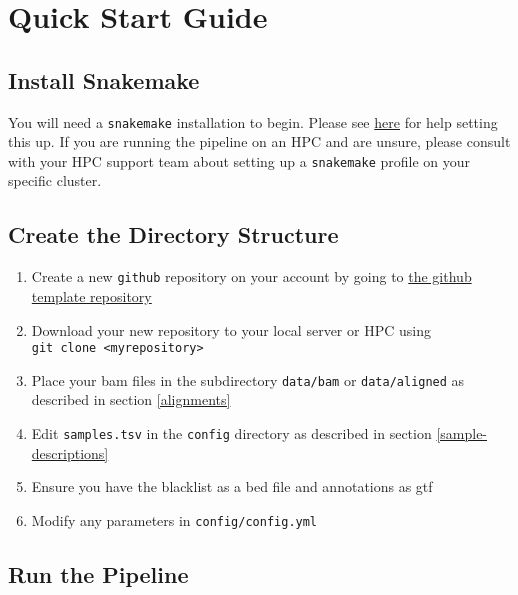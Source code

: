 \documentclass[
]{book}
\providecommand{\tightlist}{%
  \setlength{\itemsep}{0pt}\setlength{\parskip}{0pt}}
\begin{document}
\hypertarget{quick-start}{%
\chapter{Quick Start Guide}\label{quick-start}}

\hypertarget{snakemake}{%
\section{Install Snakemake}\label{snakemake}}

You will need a \texttt{snakemake} installation to begin.
Please see \href{https://snakemake.readthedocs.io/en/stable/getting_started/installation.html}{here} for help setting this up.
If you are running the pipeline on an HPC and are unsure, please consult with your HPC support team about setting up a \texttt{snakemake} profile on your specific cluster.

\hypertarget{quick-directories}{%
\section{Create the Directory Structure}\label{quick-directories}}

\begin{enumerate}
\def\labelenumi{\arabic{enumi}.}
\tightlist
\item
  Create a new \texttt{github} repository on your account by going to \href{https://github.com/smped/GRAVI/generate}{the github template repository}
\item
  Download your new repository to your local server or HPC using \texttt{git\ clone\ \textless{}myrepository\textgreater{}}
\item
  Place your bam files in the subdirectory \texttt{data/bam} or \texttt{data/aligned} as described in section \ref{alignments}
\item
  Edit \texttt{samples.tsv} in the \texttt{config} directory as described in section \ref{sample-descriptions}
\item
  Ensure you have the blacklist as a bed file and annotations as gtf
\item
  Modify any parameters in \texttt{config/config.yml}
\end{enumerate}

\hypertarget{quick-run}{%
\section{Run the Pipeline}\label{quick-run}}
\end{document}
